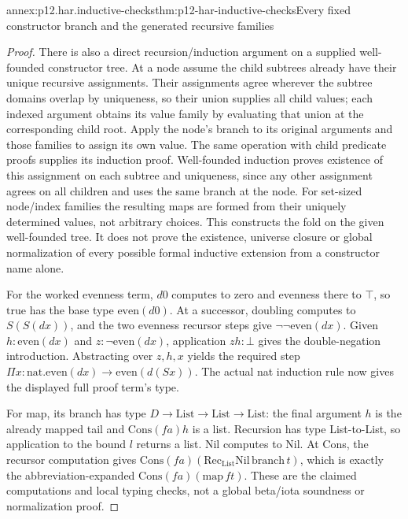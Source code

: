 \begin{annexitem}{annex:p12.har.inductive-checks}{thm:p12-har-inductive-checks}{Every fixed constructor branch and the generated recursive families}
\begin{proof}
There is also a direct recursion/induction argument on a supplied
well-founded constructor tree. At a node assume the child subtrees
already have their unique recursive assignments. Their assignments
agree wherever the subtree domains overlap by uniqueness, so their
union supplies all child values; each indexed argument obtains its
value family by evaluating that union at the corresponding child root.
Apply the node's branch to its original arguments and those families
to assign its own value. The same operation with child predicate
proofs supplies its induction proof. Well-founded induction proves
existence of this assignment on each subtree and uniqueness, since
any other assignment agrees on all children and uses the same branch
at the node. For set-sized node/index families the resulting maps are
formed from their uniquely determined values, not arbitrary choices.
This constructs the fold on the given well-founded tree. It does not
prove the existence, universe closure or global normalization of every
possible formal inductive extension from a constructor name alone.

For the worked evenness term, \(d0\) computes to zero and evenness
there to \(\top\), so \(\mathrm{true}\) has the base type
\(\mathrm{even}(d0)\). At a successor, doubling computes to
\(S(S(dx))\), and the two evenness recursor steps give
\(\neg\neg\mathrm{even}(dx)\). Given
\(h:\mathrm{even}(dx)\) and \(z:\neg\mathrm{even}(dx)\),
application \(zh:\bot\) gives the double-negation introduction.
Abstracting over \(z,h,x\) yields the required step
\(\Pi x:\mathrm{nat}.\mathrm{even}(dx)\to
\mathrm{even}(d(Sx))\). The actual nat induction rule now gives
the displayed full proof term's type.

For map, its branch has type
\(D\to\mathrm{List}\to\mathrm{List}\to\mathrm{List}\):
the final argument \(h\) is the already mapped tail and
\(\mathrm{Cons}(fa)h\) is a list. Recursion has type
List-to-List, so application to the bound \(l\) returns a list.
Nil computes to Nil. At Cons, the recursor computation gives
\(\mathrm{Cons}(fa)(\mathrm{Rec}_{\mathrm{List}}
\mathrm{Nil}\,\mathrm{branch}\,t)\), which is exactly the
abbreviation-expanded \(\mathrm{Cons}(fa)(\mathrm{map}\,ft)\).
These are the claimed computations and local typing checks, not a
global beta/iota soundness or normalization proof.
\end{proof}
\end{annexitem}

